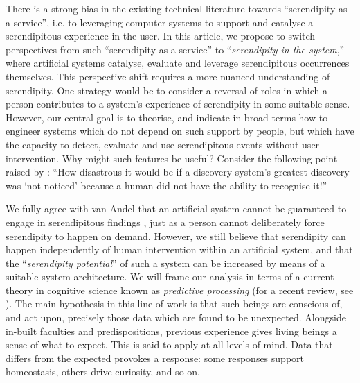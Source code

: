 There is a strong bias in the existing technical literature towards ``serendipity as a service'', i.e. to leveraging computer systems to support and catalyse a serendipitous experience in the user. In this article, we propose to switch perspectives from such ``serendipity as a service'' to ``\emph{serendipity in the system},'' where artificial systems catalyse, evaluate and leverage serendipitous occurrences themselves. This perspective shift requires a more nuanced understanding of serendipity.  One strategy would be to consider a reversal of roles in which a person contributes to a system's experience of serendipity in some suitable sense.  However, our central goal is to theorise, and indicate in broad terms how to engineer systems which do not depend on such support by people, but which have the capacity to detect, evaluate and use serendipitous events without user intervention.  Why might such features be useful?  Consider the following point raised by \citet{delamaza1994generate}: ``How disastrous it would be if a discovery system's greatest discovery was `not noticed' because a human did not have the ability to recognise it!''

We fully agree with van Andel that an artificial system cannot be guaranteed to engage in serendipitous findings \cite{van1994anatomy}, just as a person cannot deliberately force serendipity to happen on demand.  However, we still believe that serendipity can happen independently of human intervention within an artificial system, and that the ``\emph{serendipity potential}'' of such a system can be increased by means of a suitable system architecture. 
We will frame our analysis in terms of a current theory in cognitive science known as \emph{predictive processing} (for a recent review, see \cite{newen2018oxford}).   The main hypothesis in this line of work is that such beings are conscious of, and act upon, precisely those data which are found to be unexpected.  Alongside in-built faculties and predispositions, previous experience gives living beings a sense of what to expect. This is said to apply at all levels of mind.  Data that differs from the expected provokes a response: some responses support homeostasis, others drive curiosity, and so on.

